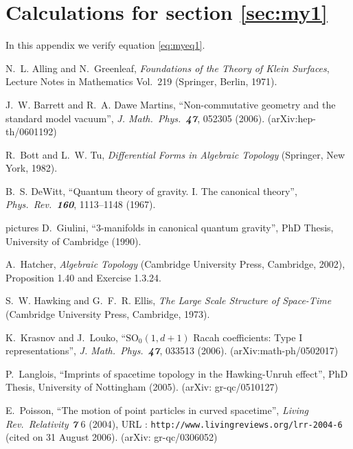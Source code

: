 \documentclass{uonmathreport}
\begin{document}
\section{Calculations for section \ref{sec:my1}} \label{app:calculations}

In this appendix we verify equation \eqref{eq:myeq1}.

\newpage

\begin{thebibliography}{99} %

N.~L. Alling and N.~Greenleaf,
{\it Foundations of the Theory of Klein Surfaces\/},
Lecture Notes in Mathematics Vol.~219
(Springer, Berlin, 1971).

J.~W. Barrett and R.~A. Dawe Martins,
``Non-commutative geometry and the standard model vacuum'',
{\it J. Math.\ Phys.\ \bf 47}, 052305 (2006).
(arXiv:hep-th/0601192)

R.~Bott and L.~W. Tu,
{\it Differential Forms in Algebraic Topology\/}
(Springer, New York, 1982).

B.~S. DeWitt,
``Quantum theory of gravity. I. The canonical theory'',
{\it Phys.\ Rev.\ \bf 160}, 1113--1148
(1967).

 pictures
D.~Giulini,
``3-manifolds in canonical quantum gravity'',
PhD Thesis,
University of Cambridge (1990).

A.~Hatcher,
{\it Algebraic Topology\/}
(Cambridge University Press, Cambridge, 2002),
Proposition 1.40 and Exercise 1.3.24.

S.~W. Hawking and G.~F.~R. Ellis,
{\it The Large Scale Structure of Space-Time\/}
(Cambridge University Press, Cambridge, 1973).

K.~Krasnov and J.~Louko,
``$\mathrm{SO}_0(1,d+1)$ Racah coefficients: Type I representations'',
{\it J. Math.\ Phys.\ \bf 47}, 033513 (2006).
(arXiv:math-ph/0502017)

P.~Langlois,
``Imprints of spacetime topology in the Hawking-Unruh effect'',
PhD Thesis, University of Nottingham (2005).
(arXiv: gr-qc/0510127)

E.~Poisson,
``The motion of point particles in curved spacetime'',
{\it Living Rev.\ Relativity \bf 7} 6 (2004),
URL : \texttt{http://www.livingreviews.org/lrr-2004-6} (cited on 31 August 2006).
(arXiv: gr-qc/0306052)


\end{thebibliography}
\end{document}
